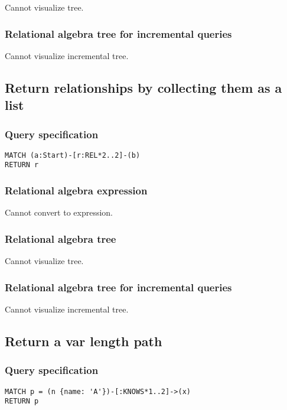 Cannot visualize tree.

\subsubsection*{Relational algebra tree for incremental queries}

Cannot visualize incremental tree.

\subsection{Return relationships by collecting them as a list}

\subsubsection*{Query specification}

\begin{lstlisting}
MATCH (a:Start)-[r:REL*2..2]-(b)
RETURN r
\end{lstlisting}

\subsubsection*{Relational algebra expression}

Cannot convert to expression.

\subsubsection*{Relational algebra tree}

Cannot visualize tree.

\subsubsection*{Relational algebra tree for incremental queries}

Cannot visualize incremental tree.

\subsection{Return a var length path}

\subsubsection*{Query specification}

\begin{lstlisting}
MATCH p = (n {name: 'A'})-[:KNOWS*1..2]->(x)
RETURN p
\end{lstlisting}

